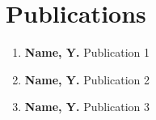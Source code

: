\chapter*{Publications}
  \thispagestyle{plain}


\vspace*{\fill}
\begin{enumerate}[label=\textbf{(\roman*)}]
	
	\item \textbf{Name, Y.} Publication 1
	\item \textbf{Name, Y.} Publication 2
	\item \textbf{Name, Y.} Publication 3
	
\end{enumerate}
\vspace*{\fill}